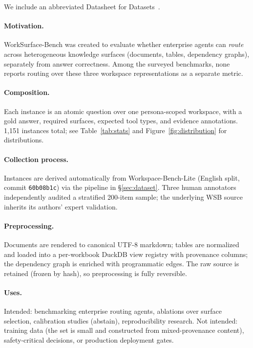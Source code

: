 \documentclass[11pt]{article}
\begin{document}
We include an abbreviated Datasheet for Datasets~\cite{gebru2018datasheets}.

\paragraph{Motivation.}
WorkSurface-Bench was created to evaluate whether enterprise agents can
\emph{route} across heterogeneous knowledge surfaces (documents, tables,
dependency graphs), separately from answer correctness. Among the surveyed
benchmarks, none reports routing over these three workspace representations as
a separate metric.

\paragraph{Composition.}
Each instance is an atomic question over one persona-scoped workspace, with a
gold answer, required surfaces, expected tool types, and evidence annotations.
1{,}151 instances total; see Table~\ref{tab:stats} and
Figure~\ref{fig:distribution} for distributions.

\paragraph{Collection process.}
Instances are derived automatically from Workspace-Bench-Lite (English split,
commit \texttt{60b08b1c}) via the pipeline in \S\ref{sec:dataset}. Three
human annotators independently audited a stratified 200-item sample; the
underlying WSB source inherits its authors' expert validation.

\paragraph{Preprocessing.}
Documents are rendered to canonical UTF-8 markdown; tables are normalized and
loaded into a per-workbook DuckDB view registry with provenance columns; the
dependency graph is enriched with programmatic edges. The raw source is
retained (frozen by hash), so preprocessing is fully reversible.

\paragraph{Uses.}
Intended: benchmarking enterprise routing agents, ablations over surface
selection, calibration studies (abstain), reproducibility research.
Not intended: training data (the set is small and constructed from
mixed-provenance content), safety-critical decisions, or production
deployment gates.
\end{document}
